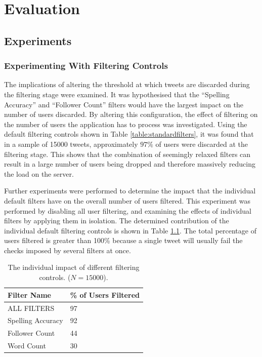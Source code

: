 \documentclass{l4proj}
\begin{document}
        
\chapter{Evaluation}

\section{Experiments}
    
    \subsection{Experimenting With Filtering Controls}
    The implications of altering the threshold at which tweets are discarded during the filtering stage were examined. It was hypothesised that the ``Spelling Accuracy'' and ``Follower Count'' filters would have the largest impact on the number of users discarded. By altering this configuration, the effect of filtering on the number of users the application has to process was investigated. Using the default filtering controls shown in Table \ref{table:standardfilters}, it was found that in a sample of 15000 tweets, approximately $97\%$ of users were discarded at the filtering stage. This shows that the combination of seemingly relaxed filters can result in a large number of users being dropped and therefore massively reducing the load on the server. 
    
Further experiments were performed to determine the impact that the individual default filters have on the overall number of users filtered. This experiment was performed by disabling all user filtering, and examining the effects of individual filters by applying them in isolation. The determined contribution of the individual default filtering controls is shown in Table \ref{table:filteringresults}. The total percentage of users filtered is greater than 100\% because a single tweet will usually fail the checks imposed by several filters at once.

    
\begin{table}
    \centering
    \begin{tabular}{| l | l |}
    \hline
    Filter Name & \% of Users Filtered \\ \hline
    ALL FILTERS & 97 \\ \hline
    Spelling Accuracy & 92  \\ \hline
    Follower Count & 44 \\ \hline
    Word Count & 30 \\
    \hline
    \end{tabular}
    \caption{\label{table:filteringresults}The individual impact of different filtering controls. ($N=15000$).}
\end{table}
   
\end{document}

